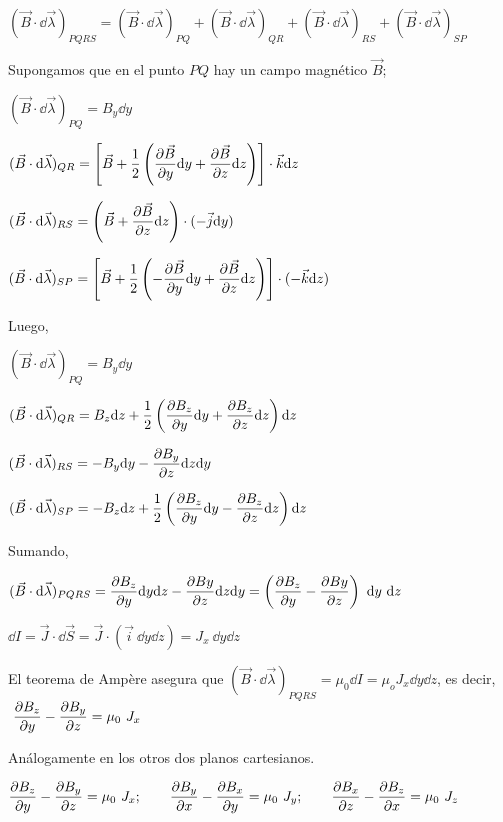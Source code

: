$(\vec B \cdot \dd \vec \lambda)_{PQRS}=(\vec B \cdot \dd \vec \lambda)_{PQ}+(\vec B \cdot \dd \vec \lambda)_{QR}+(\vec B \cdot \dd \vec \lambda)_{RS}+(\vec B \cdot \dd \vec \lambda)_{SP}$

Supongamos que en el punto $PQ$ hay un campo magnético $\vec B$; 

$(\vec B \cdot \dd \vec \lambda)_{PQ}=B_y \dd y$


$(\vec B \cdot \dd \vec \lambda)_{QR}=\displaystyle \left[ \vec B+\dfrac 1 2 \left( \pdv{\vec B}{y} \dd y + \pdv{\vec B}{z}  \dd z \right) \right]  \cdot \vec k \dd z$

$(\vec B \cdot \dd \vec \lambda)_{RS}=\displaystyle \left( \vec B+ \pdv{\vec B}{z} \dd z \right)   \cdot (-\vec j \dd y)$

$(\vec B \cdot \dd \vec \lambda)_{SP}=\displaystyle \left[ \vec B+\dfrac 1 2 \left( -\pdv{\vec B}{y} \dd y + \pdv{\vec B}{z}  \dd z \right) \right] \cdot (-\vec k \dd z)$

Luego, 

$(\vec B \cdot \dd \vec \lambda)_{PQ}=\displaystyle B_y \dd y$


$(\vec B \cdot \dd \vec \lambda)_{QR}=\displaystyle B_z \dd z +\dfrac 1 2 \left( \pdv {B_z}{y}\dd y + \pdv{B_z}{z} \dd z \right) \dd z$

$(\vec B \cdot \dd \vec \lambda)_{RS}=\displaystyle -B_y \dd y - \pdv{B_y}{z}\dd z \dd y $

$(\vec B \cdot \dd \vec \lambda)_{SP}=\displaystyle -B_z \dd z + \dfrac 1 2 \left( \pdv{B_z}{y} \dd y -\pdv{B_z}{z} \dd z \right) \dd z $

Sumando,

$\displaystyle (\vec B \cdot \dd \vec \lambda)_{PQRS}=\pdv{B_z}{y}\dd y \dd z - \pdv{By}{z}\dd z \dd y= \left( \pdv{B_z}{y} - \pdv{By}{z} \right)\ \dd y \ \dd z$

$\dd I = \vec J \cdot \dd \vec S= \vec J \cdot \left( \vec i \ \dd y \dd z \right) = J_x \ \dd y \dd z$

El teorema de Ampère asegura que $\displaystyle (\vec B \cdot \dd \vec \lambda)_{PQRS} =\mu_0 \dd I = \mu_o J_x \dd y \dd z$, es decir,
$\ \displaystyle  \pdv{B_z}{y} - \pdv{B_y}{z} = \mu_0 \ J_x$

Análogamente en los otros dos planos cartesianos.

$
\displaystyle  \pdv{B_z}{y} - \pdv{B_y}{z} = \mu_0 \ J_x; 
\qquad \displaystyle  \pdv{B_y}{x} - \pdv{B_x}{y} = \mu_0 \ J_y;
\qquad \displaystyle  \pdv{B_x}{z} - \pdv{B_z}{x} = \mu_0 \ J_z 	
$

